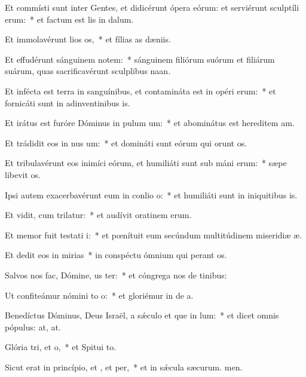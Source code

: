 \item Et commísti sunt inter Gentes, et didicérunt ópera eórum: et serviérunt sculptíli erum:~* et factum est lis in dalum.
\item Et immolavérunt lios os,~* et fílias as dæniis.
\item Et effudérunt sánguinem notem:~* sánguinem filiórum suórum et filiárum suárum, quas sacrificavérunt sculplibus naan.
\item Et infécta est terra in sanguínibus, et contamináta est in opéri erum:~* et fornicáti sunt in adinventinibus is.
\item Et irátus est furóre Dóminus in pulum um:~* et abominátus est hereditem am.
\item Et trádidit eos in nus um:~* et domináti sunt eórum qui orunt os.
\item Et tribulavérunt eos inimíci eórum, et humiliáti sunt sub máni erum:~* sæpe libevit os.
\item Ipsi autem exacerbavérunt eum in conlio o:~* et humiliáti sunt in iniquitibus is.
\item Et vidit, cum trilatur:~* et audívit oratinem erum.
\item Et memor fuit testati i:~* et pœnítuit eum secúndum multitúdinem miseridiæ æ.
\item Et dedit eos in mirias~* in conspéctu ómnium qui perant os.
\item Salvos nos fac, Dómine, us ter:~* et cóngrega nos de tinibus:
\item Ut confiteámur nómini to o:~* et gloriémur in de a.
\item Benedíctus Dóminus, Deus Israël, a sǽculo et que in lum:~* et dicet omnis pópulus: at, at.
\item Glória tri, et o,~* et Spitui to.
\item Sicut erat in princípio, et , et per,~* et in sǽcula sæcurum. men.
